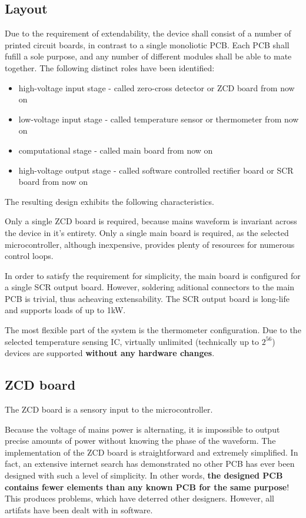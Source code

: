 \subsection{Layout}
Due to the requirement of extendability, the device shall consist of a number of printed circuit boards, in contrast to a single  monoliotic PCB.
Each PCB shall fufill a sole purpose, and any number of different modules shall be able to mate together.
The following distinct roles have been identified:
\begin{itemize}
\item{high-voltage input stage - called zero-cross detector or ZCD board from now on}
\item{low-voltage input stage - called temperature sensor or thermometer from now on}
\item{computational stage - called main board from now on}
\item{high-voltage output stage - called software controlled rectifier board or SCR board from now on}
\end{itemize}
The resulting design exhibits the following characteristics.
\par
Only a single ZCD board is required, because mains waveform is invariant across the device in it's entirety.
Only a single main board is required, as the selected microcontroller, although inexpensive, provides plenty of resources for numerous control loops.
\par
In order to satisfy the requirement for simplicity, the main board is configured for a single SCR output board.
However, soldering aditional connectors to the main PCB is trivial, thus acheaving extensability.
The SCR output board is long-life and supports loads of up to 1\si{\kilo\watt}.
\par
The most flexible part of the system is the thermometer configuration.
Due to the selected temperature sensing IC, virtually unlimited (technically up to $2^{56}$) devices are supported \textbf{without any hardware changes}.

\subsection{ZCD board}
The ZCD board is a sensory input to the microcontroller.
\par
Because the voltage of mains power is alternating, it is impossible to output precise amounts of power without knowing the phase of the waveform.
The implementation of the ZCD board is straightforward and extremely simplified.
In fact, an extensive internet search has demonstrated no other PCB has ever been designed with such a level of simplicity.
In other words, \textbf{the designed PCB contains fewer elements than any known PCB for the same purpose}!
This produces problems, which have deterred other designers.
However, all artifats have been dealt with in software.

